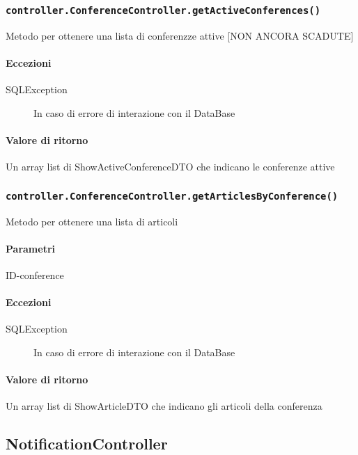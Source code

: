 \subsubsection{\texttt{controller.ConferenceController.getActiveConferences()}}
Metodo per ottenere una lista di conferenzze attive [NON ANCORA SCADUTE]
\paragraph{Eccezioni}
\begin{description}
\item[SQLException] In caso di errore di interazione con il DataBase
\end{description}
\paragraph{Valore di ritorno}
Un array list di ShowActiveConferenceDTO che indicano le conferenze attive

\subsubsection{\texttt{controller.ConferenceController.getArticlesByConference()}}
Metodo per ottenere una lista di articoli
\paragraph{Parametri}
\begin{description}
\item ID-conference
\end{description}
\paragraph{Eccezioni}
\begin{description}
\item[SQLException] In caso di errore di interazione con il DataBase
\end{description}
\paragraph{Valore di ritorno}
Un array list di ShowArticleDTO che indicano gli articoli della conferenza



\subsection{NotificationController}
